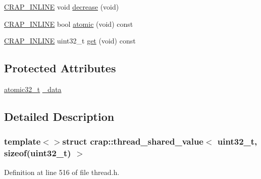 \begin{DoxyCompactItemize}
\item 
\hyperlink{config__x86_8h_a5a40526b8d842e7ff731509998bb0f1c}{C\+R\+A\+P\+\_\+\+I\+N\+L\+I\+N\+E} void \hyperlink{structcrap_1_1thread__shared__value_3_01uint32__t_00_01sizeof_07uint32__t_08_01_4_adcba76f3c44b419b88e5c0ef83ccf966}{decrease} (void)
\item 
\hyperlink{config__x86_8h_a5a40526b8d842e7ff731509998bb0f1c}{C\+R\+A\+P\+\_\+\+I\+N\+L\+I\+N\+E} bool \hyperlink{structcrap_1_1thread__shared__value_3_01uint32__t_00_01sizeof_07uint32__t_08_01_4_a3b967e0bd7b3bd2ffb2eb4f5beeff313}{atomic} (void) const 
\item 
\hyperlink{config__x86_8h_a5a40526b8d842e7ff731509998bb0f1c}{C\+R\+A\+P\+\_\+\+I\+N\+L\+I\+N\+E} uint32\+\_\+t \hyperlink{structcrap_1_1thread__shared__value_3_01uint32__t_00_01sizeof_07uint32__t_08_01_4_a6c926e378ba419ffed9f0041fa6873fa}{get} (void) const 
\end{DoxyCompactItemize}
\subsection*{Protected Attributes}
\begin{DoxyCompactItemize}
\item 
\hyperlink{structcrap_1_1atomic32__t}{atomic32\+\_\+t} \hyperlink{structcrap_1_1thread__shared__value_3_01uint32__t_00_01sizeof_07uint32__t_08_01_4_aaec31e3741a95d538a67ada4221e8a5f}{\+\_\+data}
\end{DoxyCompactItemize}


\subsection{Detailed Description}
\subsubsection*{template$<$$>$struct crap\+::thread\+\_\+shared\+\_\+value$<$ uint32\+\_\+t, sizeof(uint32\+\_\+t) $>$}



Definition at line 516 of file thread.\+h.



